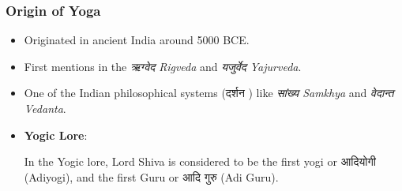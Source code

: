 \begin{frame}[fragile]\frametitle{Origin of Yoga}

      \begin{itemize}
		\item Originated in ancient India around 5000 BCE.
		\item First mentions in the \textit{ऋग्वेद  Rigveda} and \textit{यजुर्वेद  Yajurveda}.
		\item One of the Indian philosophical systems (दर्शन ) like \textit{सांख्य  Samkhya} and \textit{वेदान्त  Vedanta}.
          
          
          
          
        \item \textbf{Yogic Lore}: 
          
          In the Yogic lore, Lord Shiva is considered to be the first yogi or आदियोगी (Adiyogi), and the first Guru or आदि गुरु (Adi Guru).
          		
	  \end{itemize}

\end{frame}

